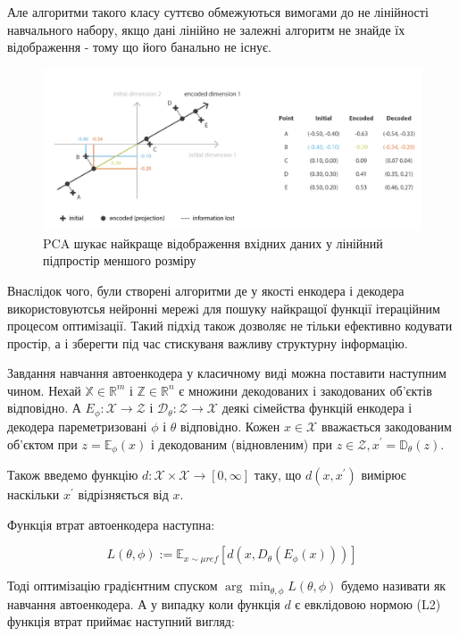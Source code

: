 Але алгоритми такого класу суттєво обмежуються вимогами до не лінійності навчального набору, якщо дані лінійно не залежні алгоритм не знайде їх відображення - тому що його банально не існує.
\begin{figure}
    \centering
    \includegraphics[width=1\textwidth]{images/PCA.png}
    \caption{PCA шукає найкраще відображення вхідних даних у лінійний підпростір меншого розміру}
\end{figure}
Внаслідок чого, були створені алгоритми де у якості енкодера і декодера використовуютсья нейронні мережі для пошуку найкращої функції ітераційним процесом оптимізації. Такий підхід також дозволяє не тільки ефективно кодувати простір, а і зберегти під час стискуваня важливу структурну інформацію.

Завдання навчання автоенкодера у класичному виді можна поставити наступним чином. Нехай $\mathbb{X} \in \mathbb{R}^{m}$ і $\mathbb{Z}\in \mathbb{R}^{n}$ є множини декодованих і закодованих об’єктів відповідно. А $E_{\phi}: \mathcal{X} \to \mathcal{Z} $ і $\mathcal{D}_{\theta}: \mathcal{Z} \to \mathcal{X}   $ деякі сімейства функцій енкодера і декодера пареметризовані $\phi$ і $\theta$ відповідно. Кожен $x \in \mathcal{X}$ вважається закодованим об’єктом при ${z}=\mathbb{E}_{\phi}(x)$ і декодованим (відновленим) при $z \in \mathcal{Z}, x^{\prime} = \mathbb{D}_{\theta}({z})$.

Також введемо функцію $d:\mathcal{X} \times \mathcal{X} \to [0, \infty]$ таку, що $d(x,x^{\prime})$ вимірює наскільки $x^{\prime}$ відрізняється від $x$.

Функція втрат автоенкодера наступна:

\[L(\theta ,\phi ):=\mathbb {\mathbb {E} }_{x\sim \mu {ref}}[d(x,D_{\theta }(E_{\phi }(x)))]\]

Тоді оптимізацію градієнтним спуском ${\displaystyle \arg \min _{\theta ,\phi }L(\theta ,\phi )}$ будемо називати як навчання автоенкодера. А у випадку коли функція $d$ є евклідовою нормою (L2) функція втрат приймає наступний вигляд:

